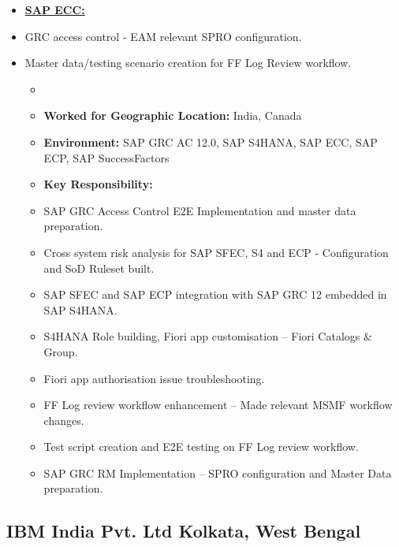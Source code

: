 \documentclass[10pt]{article}
\begin{document}
\begin{itemize}
	\small
    	\item[] \textbf{\underline{SAP ECC:}} 
		\item GRC access control - EAM relevant SPRO configuration.
    		\item Master data/testing scenario creation for FF Log Review workflow.

		
 \begin{itemize}
        \item[]  
        	\item[\ding{226}] \textbf {Worked for Geographic Location:} India, Canada
        	\item[] \textbf {Environment: } SAP GRC AC 12.0, SAP S4HANA, SAP ECC, SAP ECP, SAP SuccessFactors
    \end{itemize}
    
    \begin{itemize}
        \item[] \textbf {Key Responsibility:}
        \item SAP GRC Access Control E2E Implementation and master data preparation.
        \item Cross system risk analysis for SAP SFEC, S4 and ECP - Configuration and SoD Ruleset built.
	\item SAP SFEC and SAP ECP integration with SAP GRC 12 embedded in SAP S4HANA.
	\item S4HANA Role building, Fiori app customisation – Fiori Catalogs \& Group.
	\item Fiori app authorisation issue troubleshooting.
        	\item FF Log review workflow enhancement – Made relevant MSMF workflow changes.
    	\item Test script creation and E2E testing on FF Log review workflow.
	\item SAP GRC RM Implementation – SPRO configuration and Master Data preparation.
    \end{itemize}
    
\end{itemize}

\titlerule {\ }{}{}

\subsection{IBM India Pvt. Ltd \hfill \normalfont Kolkata, West Bengal}
\end{document}
